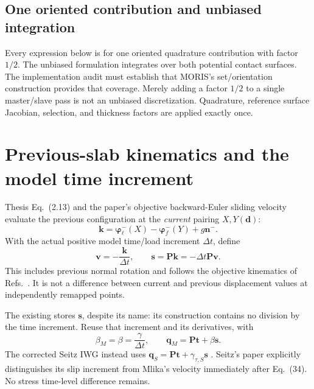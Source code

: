 \documentclass[11pt,a4paper]{article}
\newcommand{\vn}{\bm n}
\newcommand{\vt}{\bm t}
\newcommand{\vq}{\bm q}
\newcommand{\vs}{\bm s}
\newcommand{\Proj}{\bm P}
\newcommand{\code}[1]{\texttt{\detokenize{#1}}}
\begin{document}
\subsection{One oriented contribution and unbiased integration}
Every expression below is for one oriented quadrature contribution with factor
$1/2$. The unbiased formulation integrates over both potential contact surfaces.
The implementation audit must establish that MORIS's set/orientation construction
provides that coverage. Merely adding a factor $1/2$ to a single master/slave
pass is not an unbiased discretization. Quadrature, reference surface Jacobian,
selection, and thickness factors are applied exactly once.

\section{Previous-slab kinematics and the model time increment}
Thesis Eq.~(2.13) and the paper's objective backward-Euler sliding velocity
evaluate the previous configuration at the \emph{current} pairing $X,Y(\bm d)$:
\begin{equation}\label{eq:k}
 \bm k=\bm\varphi^-_\ell(X)-\bm\varphi^-_f(Y)+g\vn^-.
\end{equation}
With the actual positive model time/load increment $\Delta t$, define
\begin{equation}\label{eq:v}
 \bm v=-\frac{\bm k}{\Delta t},\qquad
 \vs=\Proj\bm k=-\Delta t\Proj\bm v.
\end{equation}
This includes previous normal rotation and follows the objective kinematics of
Refs.~\cite{mlika2018,mlika2017,poulios2015}. It is not a difference between
current and previous displacement values at independently remapped points.

The existing \code{GapData::mLeaderTangentVelocity} stores $\vs$, despite its
name: its construction contains no division by the time increment. Reuse that
increment and its derivatives, with
\begin{equation}\label{eq:beta}
 \beta_M=\beta=\frac{\gamma}{\Delta t},\qquad
 \vq_M=\Proj\vt+\beta\vs.
\end{equation}
The corrected Seitz IWG instead uses
$\vq_S=\Proj\vt+\gamma_{\tau,S}\vs$ \cite{seitz2019,seitz2019thesis}.
Seitz's paper explicitly distinguishes its slip increment from Mlika's velocity
immediately after Eq.~(34). No stress time-level difference remains.
\end{document}
